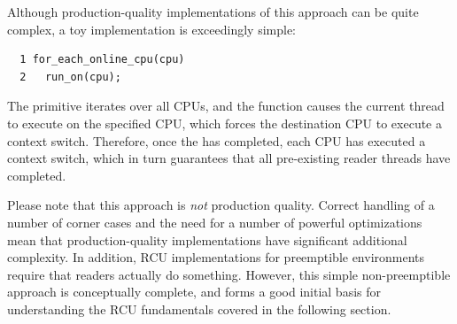 Although production-quality implementations of this approach can be
quite complex, a toy implementation is exceedingly simple:

\vspace{5pt}
\begin{minipage}[t]{\columnwidth}
\scriptsize
\begin{verbatim}
  1 for_each_online_cpu(cpu)
  2   run_on(cpu);
\end{verbatim}
\end{minipage}
\vspace{5pt}

The  primitive iterates over all CPUs, and
the  function causes the current thread to execute on the
specified CPU, which forces the destination CPU to execute a context
switch.
Therefore, once the  has completed, each CPU
has executed a context switch, which in turn guarantees that
all pre-existing reader threads have completed.

Please note that this approach is \emph{not} production quality.
Correct handling of a number of corner cases and the need for a number
of powerful optimizations mean that production-quality implementations
have significant additional complexity.
In addition, RCU implementations for preemptible environments
require that readers actually do something.
However, this simple non-preemptible approach is conceptually complete,
and forms a good initial basis for understanding the RCU fundamentals
covered in the following section.
